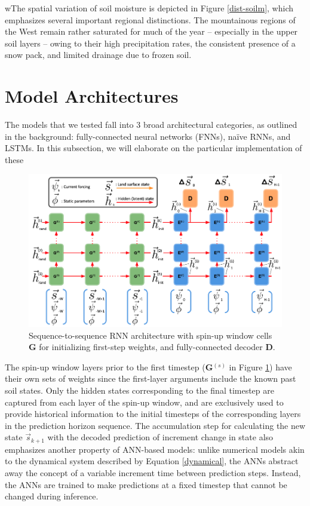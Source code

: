 wThe spatial variation of soil moisture is depicted in Figure \ref{dist-soilm}, which emphasizes several important regional distinctions. The mountainous regions of the West remain rather saturated for much of the year -- especially in the upper soil layers --  owing to their high precipitation rates, the consistent presence of a snow pack, and limited drainage due to frozen soil.

\section{Model Architectures}

The models that we tested fall into 3 broad architectural categories, as outlined in the background: fully-connected neural networks (FNNs), na\"ive RNNs, and LSTMs. In this subsection, we will elaborate on the particular implementation of these

\begin{figure}[h!]
    \centering
    \includegraphics[width=.95\linewidth]{figures/schematic_s2s-default.png}

    \caption{Sequence-to-sequence RNN architecture with spin-up window cells \textbf{G} for initializing first-step weights, and fully-connected decoder \textbf{D}.}
    \label{s2s-default}
\end{figure}

The spin-up window layers prior to the first timestep (\textbf{G}$^{(s)}$ in Figure \ref{s2s-default}) have their own sets of weights since the first-layer arguments include the known past soil states. Only the hidden states corresponding to the final timestep are captured from each layer of the spin-up window, and are exclusively used to provide historical information to the initial timesteps of the corresponding layers in the prediction horizon sequence. The accumulation step for calculating the new state $\vec{s}_{k+1}$ with the decoded prediction of increment change in state also emphasizes another property of ANN-based models: unlike numerical models akin to the dynamical system described by Equation \ref{dynamical}, the ANNs abstract away the concept of a variable increment time between prediction steps. Instead, the ANNs are trained to make predictions at a fixed timestep that cannot be changed during inference.

